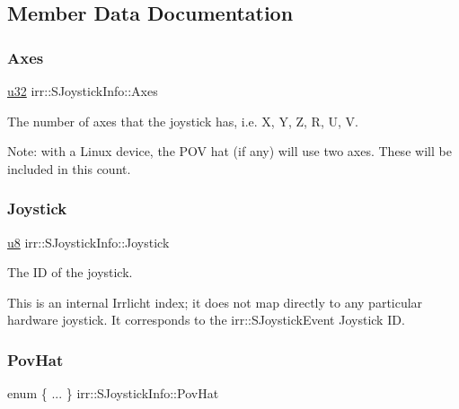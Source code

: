 \subsection{Member Data Documentation}
\mbox{\label{structirr_1_1SJoystickInfo_a0a09d1c3fc664207abaa610e5896b0c5}} 
\subsubsection{\texorpdfstring{Axes}{Axes}}
{\footnotesize\ttfamily \hyperlink{namespaceirr_a0416a53257075833e7002efd0a18e804}{u32} irr\+::\+S\+Joystick\+Info\+::\+Axes}



The number of axes that the joystick has, i.\+e. X, Y, Z, R, U, V. 

Note\+: with a Linux device, the P\+OV hat (if any) will use two axes. These will be included in this count. \mbox{\label{structirr_1_1SJoystickInfo_a691ed1bcdbf4ab3b30a4e9ed648c6d9d}} 
\subsubsection{\texorpdfstring{Joystick}{Joystick}}
{\footnotesize\ttfamily \hyperlink{namespaceirr_a646874f69af8ff87fc10201b0254a761}{u8} irr\+::\+S\+Joystick\+Info\+::\+Joystick}



The ID of the joystick. 

This is an internal Irrlicht index; it does not map directly to any particular hardware joystick. It corresponds to the irr\+::\+S\+Joystick\+Event Joystick ID. \mbox{\label{structirr_1_1SJoystickInfo_a2abf9d4741731c29fe4d9d64f7909d1e}} 
\subsubsection{\texorpdfstring{Pov\+Hat}{PovHat}\hspace{0.1cm}{\footnotesize\ttfamily [1/2]}}
{\footnotesize\ttfamily enum \{ ... \}   irr\+::\+S\+Joystick\+Info\+::\+Pov\+Hat}




